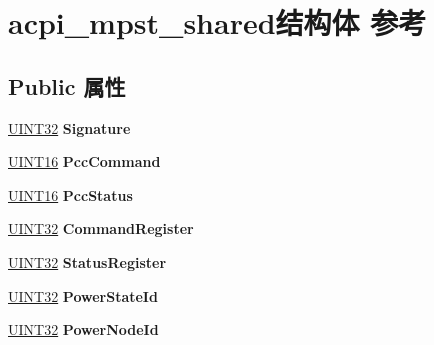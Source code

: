 \hypertarget{structacpi__mpst__shared}{}\section{acpi\+\_\+mpst\+\_\+shared结构体 参考}
\label{structacpi__mpst__shared}
\subsection*{Public 属性}
\begin{DoxyCompactItemize}
\item 
\mbox{\label{structacpi__mpst__shared_a54cdb4e820ded708cd7c869be0ca00f8}} 
\hyperlink{_processor_bind_8h_ae1e6edbbc26d6fbc71a90190d0266018}{U\+I\+N\+T32} {\bfseries Signature}
\item 
\mbox{\label{structacpi__mpst__shared_ad65613996ce8735a20b2d5edd6ee789f}} 
\hyperlink{_processor_bind_8h_a09f1a1fb2293e33483cc8d44aefb1eb1}{U\+I\+N\+T16} {\bfseries Pcc\+Command}
\item 
\mbox{\label{structacpi__mpst__shared_a9cc79039970ec386fa560bd253d36267}} 
\hyperlink{_processor_bind_8h_a09f1a1fb2293e33483cc8d44aefb1eb1}{U\+I\+N\+T16} {\bfseries Pcc\+Status}
\item 
\mbox{\label{structacpi__mpst__shared_a23636bda3f509e6361517f80c4a5c87e}} 
\hyperlink{_processor_bind_8h_ae1e6edbbc26d6fbc71a90190d0266018}{U\+I\+N\+T32} {\bfseries Command\+Register}
\item 
\mbox{\label{structacpi__mpst__shared_a7a3933f4476e1b9c675665d5c4735ada}} 
\hyperlink{_processor_bind_8h_ae1e6edbbc26d6fbc71a90190d0266018}{U\+I\+N\+T32} {\bfseries Status\+Register}
\item 
\mbox{\label{structacpi__mpst__shared_a59ff14fa7dd23d6ed1b99869adee6f4b}} 
\hyperlink{_processor_bind_8h_ae1e6edbbc26d6fbc71a90190d0266018}{U\+I\+N\+T32} {\bfseries Power\+State\+Id}
\item 
\mbox{\label{structacpi__mpst__shared_a9d4196aa6dce316ae9e7dfcc0971bbda}} 
\hyperlink{_processor_bind_8h_ae1e6edbbc26d6fbc71a90190d0266018}{U\+I\+N\+T32} {\bfseries Power\+Node\+Id}

\end{DoxyCompactItemize}
